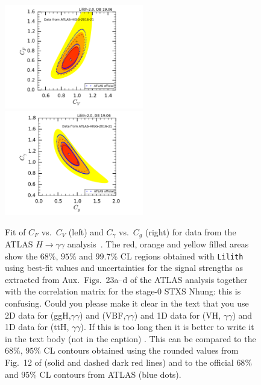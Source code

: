 \begin{figure}[h!]\centering
\includegraphics[width=0.54\textwidth]{validation/ATLAS/HIGG-2016-21-CVCF.pdf}%
\hspace{-13mm}\includegraphics[width=0.54\textwidth]{validation/ATLAS/HIGG-2016-21-CgCGa.pdf}%
\vspace*{-2mm}
\caption{Fit of $C_F$ vs.\ $C_V$ (left) and $C_\gamma$ vs.\ $C_g$ (right) for data from the ATLAS $H\to\gamma\gamma$ analysis~\cite{Aaboud:2018xdt}. The red, orange and yellow filled areas show the 
$68\%$,  $95\%$ and $99.7\%$ CL regions obtained with {\tt Lilith} using best-fit values and uncertainties for the signal strengths 
as extracted from Aux.\ Figs.~23a--d of the ATLAS analysis together with the correlation matrix for the stage-0 STXS {\nhung Nhung: this is confusing. Could you please make it clear in the text that you use 2D data for (ggH,$\gamma\gamma$) and (VBF,$\gamma\gamma$) and 1D data for (VH, $\gamma\gamma$) and 1D data for (ttH, $\gamma\gamma$). If this is too long then it is better to write it in the text body (not in the caption) }. 
This can be compared to the $68\%$,  $95\%$ CL contours obtained using the rounded values from Fig.~12 of \cite{Sirunyan:2018koj} 
(solid and dashed dark red lines) and to the official $68\%$ and $95\%$ CL contours from ATLAS (blue dots).}
\label{fig:validation_atlas_gamgam}
\end{figure}
 

